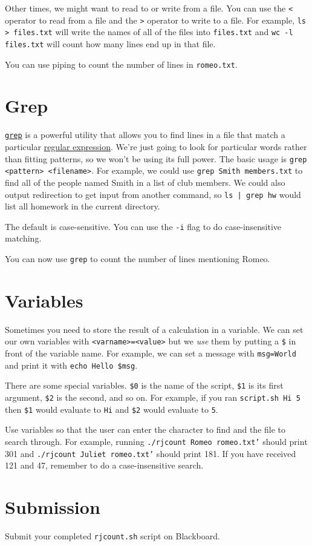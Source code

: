 \documentclass[12pt]{article}
\newcommand{\code}[1]{\texttt{#1}}
\newcommand{\filename}{\code{rjcount.sh}\xspace}
\begin{document}
Other times, we might want to read to or write from a file.
You can use the \code{<} operator to read from a file and the \code{>} operator to write to a file.
For example, \code{ls > files.txt} will write the names of all of the files into \code{files.txt} and \code{wc -l files.txt} will count how many lines end up in that file.

You can use piping to count the number of lines in \code{romeo.txt}.

\section*{Grep}

\href{https://en.wikipedia.org/wiki/Grep}{\code{grep}} is a powerful utility that allows you to find lines in a file that match a particular \href{https://en.wikipedia.org/wiki/Regular_expression}{regular expression}.
We're just going to look for particular words rather than fitting patterns, so we won't be using its full power.
The basic usage is \code{grep <pattern> <filename>}.
For example, we could use \code{grep Smith members.txt} to find all of the people named Smith in a list of club members.
We could also output redirection to get input from another command, so \code{ls | grep hw} would list all homework in the current directory.

The default is case-sensitive.
You can use the \code{-i} flag to do case-insensitive matching.

You can now use \code{grep} to count the number of lines mentioning Romeo.

\section*{Variables}

Sometimes you need to store the result of a calculation in a variable.
We can set our own variables with \code{<varname>=<value>} but we \emph{use} them by putting a \code{\$} in front of the variable name.
For example, we can set a message with \code{msg=World} and print it with \code{echo Hello \$msg}.

There are some special variables.
\code{\$0} is the name of the script, \code{\$1} is its first argument, \code{\$2} is the second, and so on.
For example, if you ran \code{script.sh Hi 5} then \code{\$1} would evaluate to \code{Hi} and \code{\$2} would evaluate to \code{5}.

Use variables so that the user can enter the character to find and the file to search through.
For example, running \code{./rjcount Romeo romeo.txt'} should print 301 and \code{./rjcount Juliet romeo.txt'} should print 181.
If you have received 121 and 47, remember to do a case-insensitive search.

\section*{Submission}

Submit your completed \filename script on Blackboard.
\end{document}
